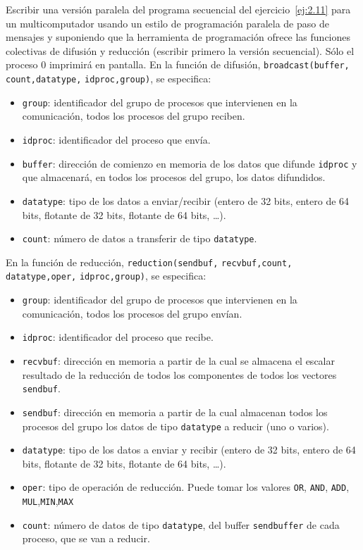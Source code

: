 \begin{ejercicio} \label{ej:2.12}
    Escribir una versión paralela del programa secuencial del ejercicio~\ref{ej:2.11} para un multicomputador
    usando un estilo de programación paralela de paso de mensajes y suponiendo que la herramienta de
    programación ofrece las funciones colectivas de difusión y reducción (escribir primero la versión secuencial). 
    Sólo el proceso 0 imprimirá en pantalla. En la función de difusión,
    \verb|broadcast(buffer,| \verb|count,datatype,| \verb|idproc,group)|, se especifica:
    \begin{itemize}
        \item \verb|group|: identificador del grupo de procesos que intervienen en la comunicación, todos los procesos
        del grupo reciben.
        \item \verb|idproc|: identificador del proceso que envía.
        \item \verb|buffer|: dirección de comienzo en memoria de los datos que difunde \verb|idproc| y que almacenará,
        en todos los procesos del grupo, los datos difundidos.
        \item \verb|datatype|: tipo de los datos a enviar/recibir (entero de 32 bits, entero de 64 bits, flotante de 32
        bits, flotante de 64 bits, \dots).
        \item \verb|count|: número de datos a transferir de tipo \verb|datatype|.
    \end{itemize}
    En la función de reducción, \verb|reduction(sendbuf,| \verb|recvbuf,count,| \verb|datatype,oper,| \verb|idproc,group)|,
    se especifica:
    \begin{itemize}
        \item \verb|group|: identificador del grupo de procesos que intervienen en la comunicación, todos los procesos
        del grupo envían.
        \item \verb|idproc|: identificador del proceso que recibe.
        \item \verb|recvbuf|: dirección en memoria a partir de la cual se almacena el escalar resultado de la reducción
        de todos los componentes de todos los vectores \verb|sendbuf|.
        \item \verb|sendbuf|: dirección en memoria a partir de la cual almacenan todos los procesos del grupo los
        datos de tipo \verb|datatype| a reducir (uno o varios).
        \item \verb|datatype|: tipo de los datos a enviar y recibir (entero de 32 bits, entero de 64 bits, flotante de 32
        bits, flotante de 64 bits, \dots).
        \item \verb|oper|: tipo de operación de reducción. Puede tomar los valores \verb|OR|, \verb|AND|, \verb|ADD|, \verb|MUL|,\verb|MIN|,\verb|MAX|
        \item \verb|count|: número de datos de tipo \verb|datatype|, del buffer \verb|sendbuffer| de cada proceso, que se van a reducir.
    \end{itemize}
\end{ejercicio}

